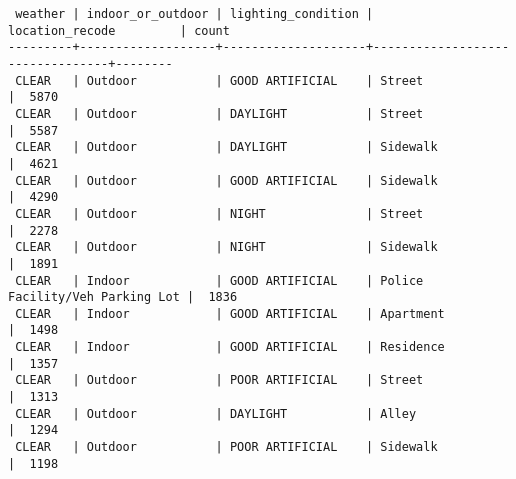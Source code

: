 \documentclass[10pt]{article}
\begin{document}
\begin{verbatim}
 weather | indoor_or_outdoor | lighting_condition |         location_recode         | count
---------+-------------------+--------------------+---------------------------------+--------
 CLEAR   | Outdoor           | GOOD ARTIFICIAL    | Street                          |  5870
 CLEAR   | Outdoor           | DAYLIGHT           | Street                          |  5587
 CLEAR   | Outdoor           | DAYLIGHT           | Sidewalk                        |  4621
 CLEAR   | Outdoor           | GOOD ARTIFICIAL    | Sidewalk                        |  4290
 CLEAR   | Outdoor           | NIGHT              | Street                          |  2278
 CLEAR   | Outdoor           | NIGHT              | Sidewalk                        |  1891
 CLEAR   | Indoor            | GOOD ARTIFICIAL    | Police Facility/Veh Parking Lot |  1836
 CLEAR   | Indoor            | GOOD ARTIFICIAL    | Apartment                       |  1498
 CLEAR   | Indoor            | GOOD ARTIFICIAL    | Residence                       |  1357
 CLEAR   | Outdoor           | POOR ARTIFICIAL    | Street                          |  1313
 CLEAR   | Outdoor           | DAYLIGHT           | Alley                           |  1294
 CLEAR   | Outdoor           | POOR ARTIFICIAL    | Sidewalk                        |  1198
\end{verbatim}
\end{document}
